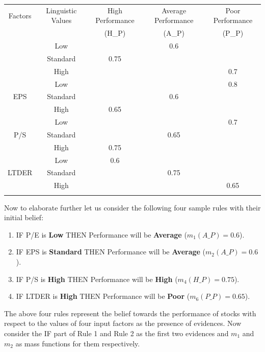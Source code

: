 \documentclass{ws-ijufks}
\begin{document}
\begin{table}[h]
	\label{tab:BPA}
	{\begin{tabular}{@{}ccccc@{}} 
			\toprule
		Factors & Linguistic Values &  High Performance  &  Average Performance  &  Poor Performance 
		\\
		& & (H\_P) & (A\_P) & (P\_P)\\
		
		\colrule
		
		\multirow {3}{1cm}{P/E}
		& Low & { } & 0.6 & { }\\ 
		& Standard & 0.75 & { } & { }\\ 
		& High & { } & { } & 0.7\\ 
		
		\multirow {3}{1cm}{EPS}
		& Low & { } & { } & {0.8}\\ 
		& Standard & { } & {0.6} & { }\\ 
		& High & {0.65} & { } & { }\\ 
		
		
		\multirow {3}{1cm}{P/S}
		& Low & { } & { } & {0.7}\\ 
		& Standard & { } & {0.65} & { }\\ 
		& High & {0.75} & { } & { }\\ 
	
		
		\multirow {3}{1.5cm}{LTDER}
		& Low & {0.6} & { } & { }\\ 
		& Standard & { } & {0.75} & { }\\ 
		& High & { } & { } & {0.65}\\ 
		
			\botrule
		\end{tabular}}
	\end{table}

Now to elaborate further let us consider the following four sample rules with their initial belief:
\begin{enumerate}
	\item IF P/E is \textbf{Low} THEN Performance will be \textbf{Average} ($m_1\left( A\_P\right) =0.6$).
	\item IF EPS is \textbf{Standard} THEN Performance will be \textbf{Average} ($m_2\left( A\_P\right) =0.6$).
	\item IF P/S is \textbf{High} THEN Performance will be \textbf{High} ($m_4\left( H\_P\right) =0.75$).
	\item IF LTDER is \textbf{High} THEN Performance will be \textbf{Poor} ($m_6\left( P\_P\right) =0.65$).
\end{enumerate}
The above four rules represent the belief towards the performance of stocks with respect to the values of four input 
factors as the presence of evidences. Now consider the IF part of Rule 1 and Rule 2 as the first two evidences and 
$m_1$ and $m_2$ as mass functions for them respectively.
\end{document}
